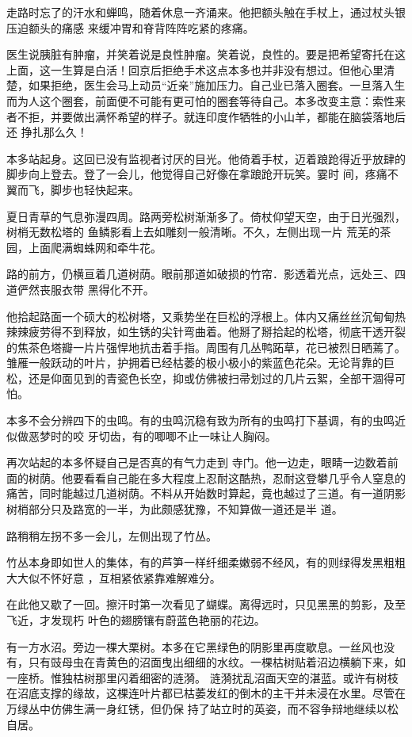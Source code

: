 \documentclass{article}
\begin{document}
走路时忘了的汗水和蝉鸣，随着休息一齐涌来。他把额头触在手杖上，通过杖头银压迫额头的痛感
来缓冲胃和脊背阵阵吃紧的疼痛。 

医生说胰脏有肿瘤，并笑着说是良性肿瘤。笑着说，良性的。要是把希望寄托在这上面，这一生算是白活！回京后拒绝手术这点本多也并非没有想过。但他心里清楚，如果拒绝，医生会马上动员“近亲”施加压力。自己业已落入圈套。一旦落入生而为人这个圈套，前面便不可能有更可怕的圈套等待自己。本多改变主意：索性来者不拒，并要做出满怀希望的样子。就连印度作牺牲的小山羊，都能在脑袋落地后还
挣扎那么久！ 

本多站起身。这回已没有监视者讨厌的目光。他倚着手杖，迈着踉跄得近乎放肆的脚步向上登去。登了一会儿，他觉得自己好像在拿踉跄开玩笑。霎时
间，疼痛不翼而飞，脚步也轻快起来。 

夏日青草的气息弥漫四周。路两旁松树渐渐多了。倚杖仰望天空，由于日光强烈，树梢无数松塔的
\newpage
鱼鳞影看上去如雕刻一般清晰。不久，左侧出现一片
荒芜的茶园，上面爬满蜘蛛网和牵牛花。 

路的前方，仍横亘着几道树荫。眼前那道如破损的竹帘．影透着光点，远处三、四道俨然丧服衣带
黑得化不开。 

他拾起路面一个硕大的松树塔，又乘势坐在巨松的浮根上。体内又痛丝丝沉甸甸热辣辣疲劳得不到释放，如生锈的尖针弯曲着。他掰了掰拾起的松塔，彻底干透开裂的焦茶色塔瓣一片片强悍地抗击着手指。周围有几丛鸭跖草，花已被烈日晒蔫了。雏雁一般跃动的叶片，护拥着已经枯萎的极小极小的紫蓝色花朵。无论背靠的巨松，还是仰面见到的青瓷色长空，抑或仿佛被扫帚划过的几片云絮，全部干涸得可怕。

本多不会分辨四下的虫鸣。有的虫鸣沉稳有致为所有的虫鸣打下基调，有的虫鸣近似做恶梦时的咬
牙切齿，有的唧唧不止一味让人胸闷。 

再次站起的本多怀疑自己是否真的有气力走到
\newpage
寺门。他一边走，眼睛一边数着前面的树荫。他要看看自己能在多大程度上忍耐这酷热，忍耐这登攀几乎令人窒息的痛苦，同时能越过几道树荫。不料从开始数时算起，竟也越过了三道。有一道阴影树梢部分只及路宽的一半，为此颇感犹豫，不知算做一道还是半
道。 


路稍稍左拐不多一会儿，左侧出现了竹丛。 

竹丛本身即如世人的集体，有的芦笋一样纤细柔嫩弱不经风，有的则绿得发黑粗粗大大似不怀好意
，互相紧依紧靠难解难分。 

在此他又歇了一回。擦汗时第一次看见了蝴蝶。离得远时，只见黑黑的剪影，及至飞近，才发现朽
叶色的翅膀镶有蔚蓝色艳丽的花边。 

有一方水沼。旁边一棵大栗树。本多在它黑绿色的阴影里再度歇息。一丝风也没有，只有豉母虫在青黄色的沼面曳出细细的水纹。一棵枯树贴着沼边横躺下来，如一座桥。惟独枯树那里闪着细密的涟漪。
\newpage
涟漪扰乱沼面天空的湛蓝。或许有树枝在沼底支撑的缘故，这棵连叶片都已枯萎发红的倒木的主干并未浸在水里。尽管在万绿丛中仿佛生满一身红锈，但仍保
持了站立时的英姿，而不容争辩地继续以松自居。 
\end{document}
